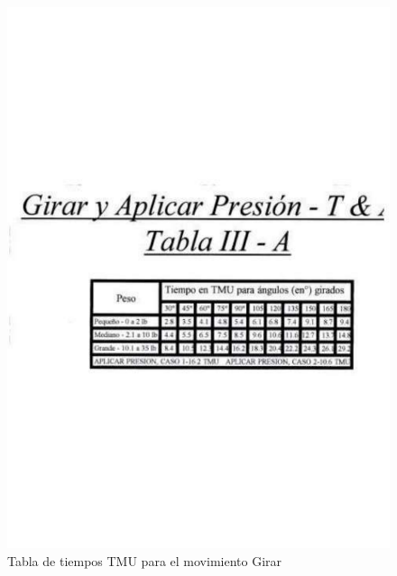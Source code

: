     \begin{figure}[H]
        \centering
        \includegraphics[trim = {20mm 40mm 20mm 25mm},clip,scale=0.25]{9/Img/tablaGirar.pdf}
        \caption{Tabla de tiempos TMU para el movimiento Girar}
        \label{fig:bimanual}
    \end{figure}
